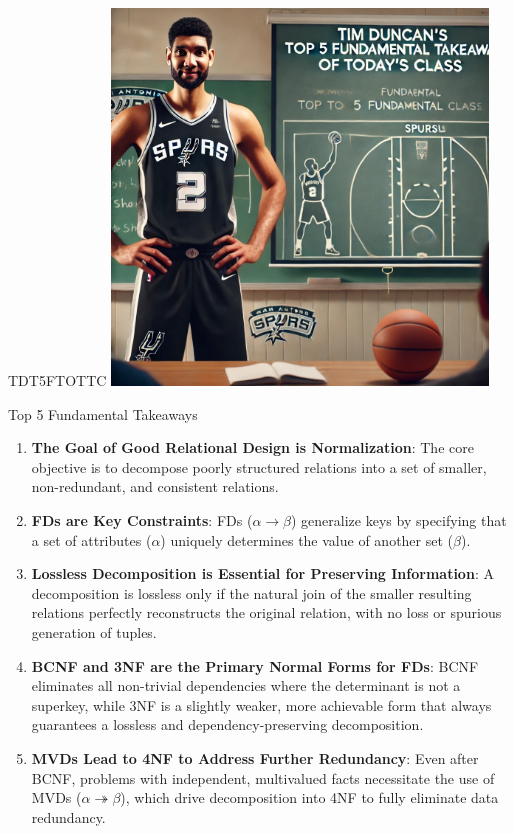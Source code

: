 \documentclass{beamer}
\begin{document}
\begin{frame}{TDT5FTOTTC}
    \centering
    \includegraphics[width=0.75\textwidth]{figures/tim.png}
\end{frame}

\begin{frame}{Top 5 Fundamental Takeaways}
    \footnotesize
    \begin{enumerate} \pause
        \item[5] \textbf{The Goal of Good Relational Design is Normalization}: The core objective is to decompose poorly structured relations into a set of smaller, non-redundant, and consistent relations. \pause

        \item[4] \textbf{FDs are Key Constraints}: FDs ($\alpha \rightarrow \beta$) generalize keys by specifying that a set of attributes ($\alpha$) uniquely determines the value of another set ($\beta$). \pause

        \item[3] \textbf{Lossless Decomposition is Essential for Preserving Information}: A decomposition is lossless only if the natural join of the smaller resulting relations perfectly reconstructs the original relation, with no loss or spurious generation of tuples. \pause

        \item[2] \textbf{BCNF and 3NF are the Primary Normal Forms for FDs}: BCNF eliminates all non-trivial dependencies where the determinant is not a superkey, while 3NF is a slightly weaker, more achievable form that always guarantees a lossless and dependency-preserving decomposition. \pause

        \item[1] \textbf{MVDs Lead to 4NF to Address Further Redundancy}: Even after BCNF, problems with independent, multivalued facts necessitate the use of MVDs ($\alpha \twoheadrightarrow \beta$), which drive decomposition into 4NF to fully eliminate data redundancy.
    \end{enumerate}
\end{frame}
\end{document}
